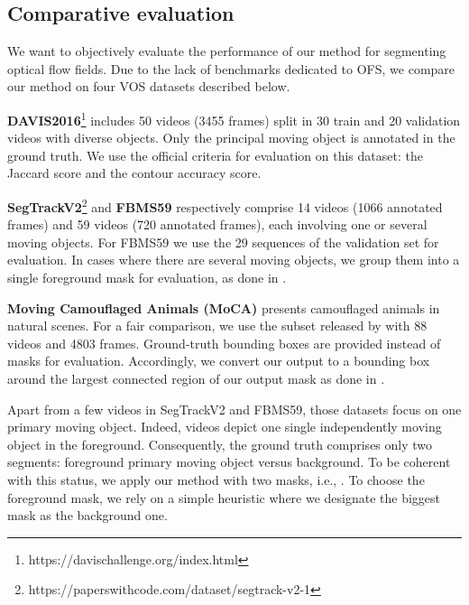 \documentclass[10pt,twocolumn,letterpaper]{article}
\begin{document}
\subsection{Comparative evaluation}
\label{eval}

We want to objectively evaluate the performance of our method for segmenting optical flow fields. Due to the lack of benchmarks dedicated to OFS, we compare our method on four VOS datasets described below.

\textbf{DAVIS2016}\footnote{https://davischallenge.org/index.html} \cite{pont-tuset_benchmark_2016} includes 50 videos (3455 frames) split in 30 train and 20 validation videos with diverse objects. Only the principal moving object is annotated in the ground truth. We use the official criteria for evaluation on this dataset: the Jaccard score and the contour accuracy score.

\textbf{SegTrackV2}\footnote{https://paperswithcode.com/dataset/segtrack-v2-1} \cite{li-SegTrackv2-2013} and \textbf{FBMS59} \cite{ochs2014} respectively comprise 14 videos (1066 annotated frames) and 59 videos (720 annotated frames), each involving one or several moving objects. For FBMS59 we use the 29 sequences of the validation set for evaluation. In cases where there are several moving objects, we group them into a single foreground mask for evaluation, as done in \cite{yang_motion-grouping_2021}.

\textbf{Moving Camouflaged Animals (MoCA)} \cite{lamdouar_camouflage_2020} presents camouflaged animals in natural scenes. For a fair comparison, we use the subset released by \cite{yang_motion-grouping_2021} with 88 videos and 4803 frames. Ground-truth bounding boxes are provided instead of masks for evaluation. Accordingly, we convert our output to a bounding box around the largest connected region of our output mask as done in \cite{yang_motion-grouping_2021}.

Apart from a few videos in SegTrackV2 and FBMS59, those datasets focus on one primary moving object. Indeed, videos depict one single independently moving object in the foreground. Consequently, the ground truth comprises only two segments: foreground primary moving object versus background. To be coherent with this status, we apply our method with two masks, i.e., . To choose the foreground mask, we rely on a simple heuristic where we designate the biggest mask as the background one. 
\end{document}
